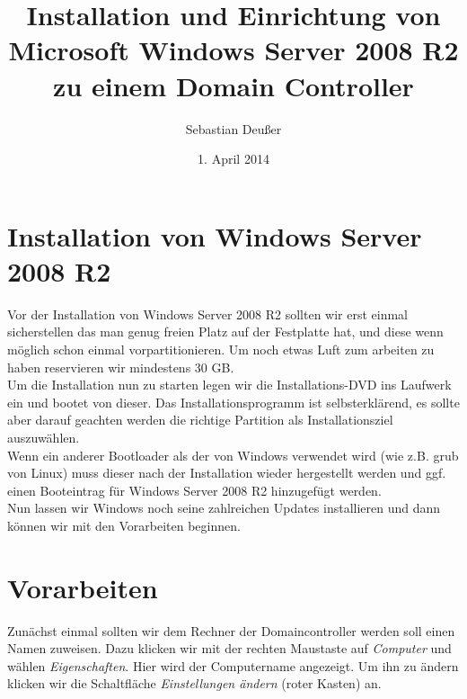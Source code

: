 \documentclass[12pt,a4paper,titlepage]{scrartcl} %
\title{Installation und Einrichtung von Microsoft Windows Server 2008 R2 zu einem Domain Controller}
\author{Sebastian Deußer}
\date{1. April 2014} %
\begin{document}
\maketitle %

\pagestyle{fancy}
\lhead{}
\chead{\leftmark}
\rhead{}
\cfoot{}

\noindent

\thispagestyle{fancy}
\tableofcontents

\newpage
\section{Installation von Windows Server 2008 R2}
Vor der Installation von Windows Server 2008 R2 sollten wir erst einmal sicherstellen das man genug freien Platz auf der Festplatte hat, und diese wenn möglich schon einmal vorpartitionieren. Um noch etwas Luft zum arbeiten zu haben reservieren wir mindestens 30 GB.\\
Um die Installation nun zu starten legen wir die Installations-DVD ins Laufwerk ein und bootet von dieser. Das Installationsprogramm ist selbsterklärend, es sollte aber darauf geachten werden die richtige Partition als Installationsziel auszuwählen.\\
Wenn ein anderer Bootloader als der von Windows verwendet wird (wie z.B. grub von Linux) muss dieser nach der Installation wieder hergestellt werden und ggf. einen Booteintrag für Windows Server 2008 R2 hinzugefügt werden.\\
Nun lassen wir Windows noch seine zahlreichen Updates installieren und dann können wir mit den Vorarbeiten beginnen.

\newpage
\section{Vorarbeiten}
Zunächst einmal sollten wir dem Rechner der Domaincontroller werden soll einen Namen zuweisen. Dazu klicken wir mit der rechten Maustaste auf \emph{Computer} und wählen \emph{Eigenschaften}. Hier wird der Computername angezeigt. Um ihn zu ändern klicken wir die Schaltfläche \emph{Einstellungen ändern} (roter Kasten) an.
\end{document}

